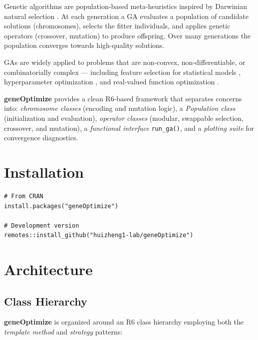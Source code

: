 \documentclass[11pt,a4paper]{article}
\begin{document}
Genetic algorithms are population-based meta-heuristics inspired by
Darwinian natural selection \citep{Holland1975}. At each generation a GA
evaluates a population of candidate solutions (chromosomes), selects the
fitter individuals, and applies genetic operators (crossover, mutation) to
produce offspring. Over many generations the population converges towards
high-quality solutions.

GAs are widely applied to problems that are non-convex, non-differentiable,
or combinatorially complex --- including feature selection for statistical
models \citep{Guyon2003}, hyperparameter optimization \citep{Bergstra2012},
and real-valued function optimization \citep{Goldberg1989}.

\textbf{geneOptimize} provides a clean R6-based framework \citep{Chang2021}
that separates concerns into: \textit{chromosome classes} (encoding and
mutation logic), a \textit{Population class} (initialization and evaluation),
\textit{operator classes} (modular, swappable selection, crossover, and
mutation), a \textit{functional interface} \texttt{run\_ga()}, and a
\textit{plotting suite} for convergence diagnostics.

\section{Installation}

\begin{lstlisting}
# From CRAN
install.packages("geneOptimize")

# Development version
remotes::install_github("huizheng1-lab/geneOptimize")
\end{lstlisting}

\section{Architecture}

\subsection{Class Hierarchy}

\textbf{geneOptimize} is organized around an R6 class hierarchy employing
both the \textit{template method} and \textit{strategy} patterns:
\end{document}
